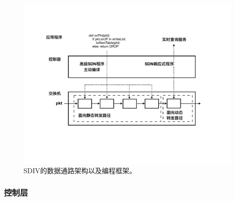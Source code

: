 \begin{figure} [t]
\begin{center}
\includegraphics[width=0.8\columnwidth]{figures/sdiv-pf.pdf}
\caption{SDIV的数据通路架构以及编程框架。} \label{fig:sdiv-dp}
\end{center}
\end{figure}



\subsubsection{控制层}

